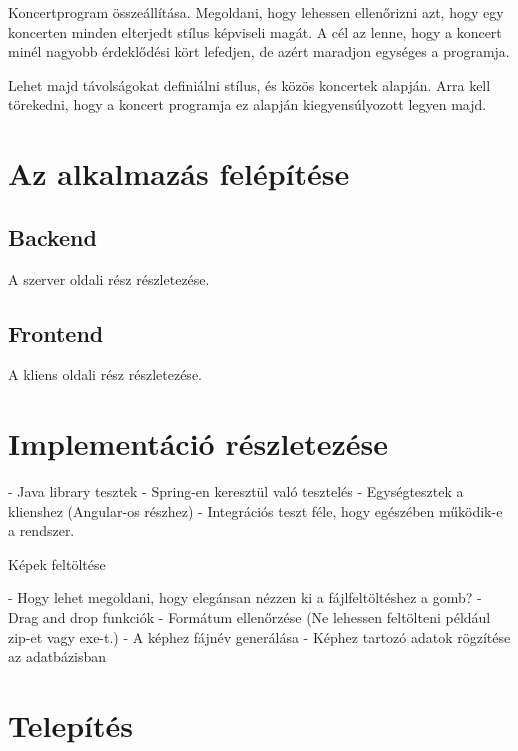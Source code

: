 \documentclass[11pt]{article}
\begin{document}
Koncertprogram összeállítása. Megoldani, hogy lehessen ellenőrizni azt, hogy egy koncerten minden elterjedt stílus képviseli magát. A cél az lenne, hogy a koncert minél nagyobb érdeklődési kört lefedjen, de azért maradjon egységes a programja.

Lehet majd távolságokat definiálni stílus, és közös koncertek alapján. Arra kell törekedni, hogy a koncert programja ez alapján kiegyensúlyozott legyen majd.

\section{Az alkalmazás felépítése}

\subsection{Backend}


A szerver oldali rész részletezése.

\subsection{Frontend}

A kliens oldali rész részletezése.

\section{Implementáció részletezése}


- Java library tesztek
- Spring-en keresztül való tesztelés
- Egységtesztek a klienshez (Angular-os részhez)
- Integrációs teszt féle, hogy egészében működik-e a rendszer.



Képek feltöltése

- Hogy lehet megoldani, hogy elegánsan nézzen ki a fájlfeltöltéshez a gomb?
- Drag and drop funkciók
- Formátum ellenőrzése (Ne lehessen feltölteni például zip-et vagy exe-t.)
- A képhez fájnév generálása
- Képhez tartozó adatok rögzítése az adatbázisban

\section{Telepítés}
\end{document}
